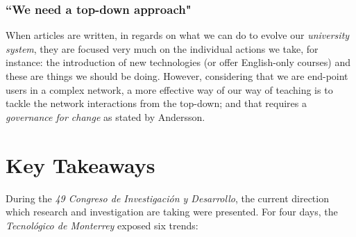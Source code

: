 \documentclass[11pt,a4paper]{article}
\begin{document}













\subsubsection*{``We need a top-down approach"}
When articles are written, in regards on what we can do to evolve our \emph{university system}, they are focused very much on the individual actions we take, for instance: the introduction of new technologies (or offer English-only courses) and these are things we should be doing. However, considering that we are end-point users in a complex network, a more effective way of our way of teaching is to tackle the network interactions from the top-down; and that requires a \emph{governance for change} as stated by Andersson.

\clearpage

\section{Key Takeaways}\label{sec:takeaways}
During the \emph{49 Congreso de Investigación y Desarrollo}, the current direction which research and investigation are taking were presented. For four days, the \emph{Tecnológico de Monterrey} exposed six trends:
\end{document}
